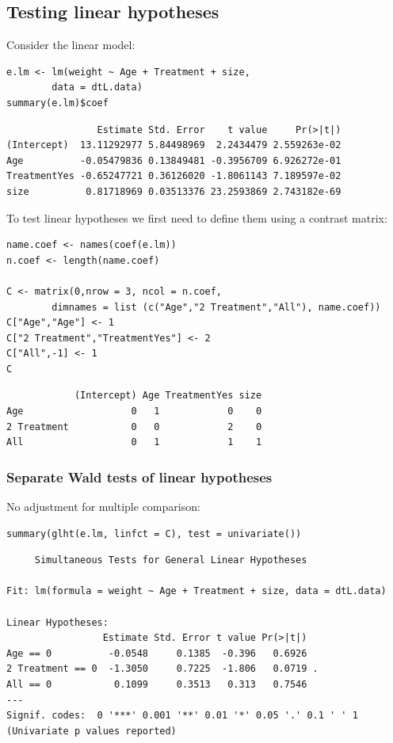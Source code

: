 \documentclass{article}
\begin{document}
\subsection{Testing linear hypotheses}
\label{sec:orgff6d646}

Consider the linear model:
\lstset{language=r,label= ,caption= ,captionpos=b,numbers=none}
\begin{lstlisting}
e.lm <- lm(weight ~ Age + Treatment + size,
	    data = dtL.data)
summary(e.lm)$coef
\end{lstlisting}

\begin{verbatim}
                Estimate Std. Error    t value     Pr(>|t|)
(Intercept)  13.11292977 5.84498969  2.2434479 2.559263e-02
Age          -0.05479836 0.13849481 -0.3956709 6.926272e-01
TreatmentYes -0.65247721 0.36126020 -1.8061143 7.189597e-02
size          0.81718969 0.03513376 23.2593869 2.743182e-69
\end{verbatim}

To test linear hypotheses we first need to define them using a contrast matrix:
\lstset{language=r,label= ,caption= ,captionpos=b,numbers=none}
\begin{lstlisting}
name.coef <- names(coef(e.lm))
n.coef <- length(name.coef)

C <- matrix(0,nrow = 3, ncol = n.coef, 
	    dimnames = list (c("Age","2 Treatment","All"), name.coef))
C["Age","Age"] <- 1
C["2 Treatment","TreatmentYes"] <- 2
C["All",-1] <- 1
C
\end{lstlisting}

\begin{verbatim}
            (Intercept) Age TreatmentYes size
Age                   0   1            0    0
2 Treatment           0   0            2    0
All                   0   1            1    1
\end{verbatim}

\subsubsection{Separate Wald tests of linear hypotheses}
\label{sec:orgcc6f7c0}

No adjustment for multiple comparison:
\lstset{language=r,label= ,caption= ,captionpos=b,numbers=none}
\begin{lstlisting}
summary(glht(e.lm, linfct = C), test = univariate())
\end{lstlisting}

\begin{verbatim}
	 Simultaneous Tests for General Linear Hypotheses

Fit: lm(formula = weight ~ Age + Treatment + size, data = dtL.data)

Linear Hypotheses:
                 Estimate Std. Error t value Pr(>|t|)  
Age == 0          -0.0548     0.1385  -0.396   0.6926  
2 Treatment == 0  -1.3050     0.7225  -1.806   0.0719 .
All == 0           0.1099     0.3513   0.313   0.7546  
---
Signif. codes:  0 '***' 0.001 '**' 0.01 '*' 0.05 '.' 0.1 ' ' 1
(Univariate p values reported)
\end{verbatim}
\end{document}
